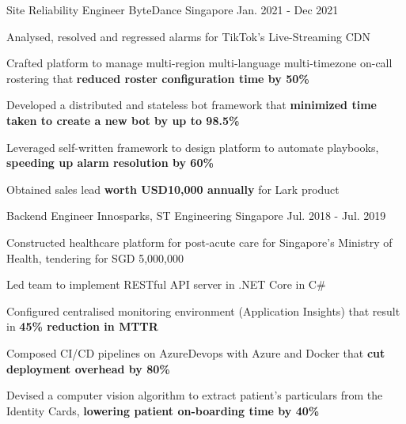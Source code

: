 \begin{cventries}
    \cventry
    {Site Reliability Engineer} %
    {ByteDance} %
    {Singapore} %
    {Jan. 2021 - Dec 2021} %
    {
    \begin{cvitems} %
        \item {Analysed, resolved and regressed alarms for TikTok's Live-Streaming CDN}
        \item {Crafted platform to manage multi-region multi-language multi-timezone on-call rostering that \textbf{reduced roster configuration time by 50\%}}
        \item {Developed a distributed and stateless bot framework that \textbf{minimized time taken to create a new bot by up to 98.5\%}}
        \item {Leveraged self-written framework to design platform to automate playbooks, \textbf{speeding up alarm resolution by 60\%}}
        \item {Obtained sales lead \textbf{worth USD10,000 annually} for Lark product}
    \end{cvitems}
    }

    \cventry
    {Backend Engineer} %
    {Innosparks, ST Engineering} %
    {Singapore} %
    {Jul. 2018 - Jul. 2019} %
    {
    \begin{cvitems} %
        \item {Constructed healthcare platform for post-acute care for Singapore's Ministry of Health, tendering for SGD 5,000,000}
        \item {Led team to implement RESTful API server in .NET Core in C\#}
        \item {Configured centralised monitoring environment (Application Insights) that result in \textbf{45\% reduction in MTTR}}
        \item {Composed CI/CD pipelines on AzureDevops with Azure and Docker that \textbf{cut deployment overhead by 80\%}}
        \item {Devised a computer vision algorithm to extract patient's particulars from the Identity Cards, \textbf{lowering patient on-boarding time by 40\%}}
    \end{cvitems}
    }


\end{cventries}
